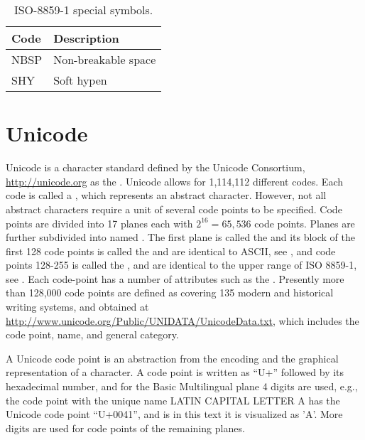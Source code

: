 \begin{table}[h]
  \centering
  \begin{tabular}{|l|l|}
    \hline
    \rowcolor{headerRowColor} Code & Description\\
    \hline
    NBSP & Non-breakable space\\
    SHY & Soft hypen\\
    \hline
  \end{tabular}
  \caption{ISO-8859-1 special symbols.}
  \label{tab:latin1SpecialSymbols}
\end{table}

\section{Unicode}
\label{sec:unicode}
Unicode is a character standard defined by the Unicode Consortium, \url{http://unicode.org} as the . Unicode allows for 1,114,112 different codes. Each code is called a , which represents an abstract character. However, not all abstract characters require a unit of several code points to be specified. Code points are divided into 17 planes each with $2^{16}=65,536$ code points. Planes are further subdivided into named . The first plane is called the  and its block of the first 128 code points is called the  and are identical to ASCII, see , and code points 128-255 is called the , and are identical to the upper range of ISO 8859-1, see .  Each code-point has a number of attributes such as the . Presently more than 128,000 code points are defined as covering 135 modern and historical writing systems, and obtained at \url{http://www.unicode.org/Public/UNIDATA/UnicodeData.txt}, which includes the code point, name, and general category.

A Unicode code point is an abstraction from the encoding and the graphical representation of a character. A code point is written as ``U+'' followed by its hexadecimal number, and for the Basic Multilingual plane 4 digits are used, e.g., the code point with the unique name LATIN CAPITAL LETTER A has the Unicode code point ``U+0041'', and is in this text it is visualized as 'A'. More digits are used for code points of the remaining planes.

